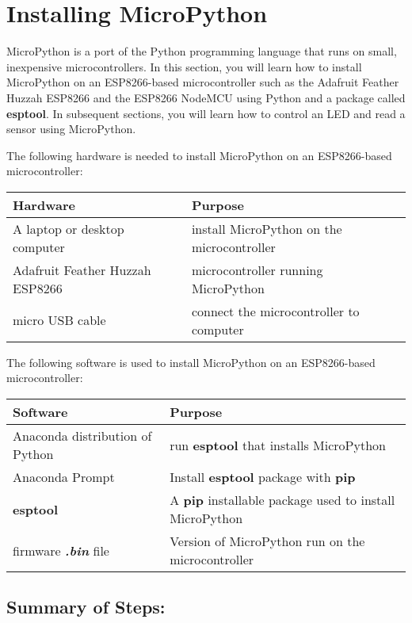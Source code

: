 \documentclass{book}
\begin{document}
    
        \hypertarget{installing-micropython}{%
\section{Installing MicroPython}\label{installing-micropython}}
    




    
        MicroPython is a port of the Python programming language that runs on
small, inexpensive microcontrollers. In this section, you will learn how
to install MicroPython on an ESP8266-based microcontroller such as the
Adafruit Feather Huzzah ESP8266 and the ESP8266 NodeMCU using Python and
a package called \textbf{esptool}. In subsequent sections, you will
learn how to control an LED and read a sensor using MicroPython.
    




    
        The following hardware is needed to install MicroPython on an
ESP8266-based microcontroller:

\begin{longtable}[]{@{}ll@{}}
\toprule
Hardware & Purpose\tabularnewline
\midrule
\endhead
A laptop or desktop computer & install MicroPython on the
microcontroller\tabularnewline
Adafruit Feather Huzzah ESP8266 & microcontroller running
MicroPython\tabularnewline
micro USB cable & connect the microcontroller to computer\tabularnewline
\bottomrule
\end{longtable}

The following software is used to install MicroPython on an
ESP8266-based microcontroller:

\begin{longtable}[]{@{}ll@{}}
\toprule
Software & Purpose\tabularnewline
\midrule
\endhead
Anaconda distribution of Python & run \textbf{esptool} that installs
MicroPython\tabularnewline
Anaconda Prompt & Install \textbf{esptool} package with
\textbf{pip}\tabularnewline
\textbf{esptool} & A \textbf{pip} installable package used to install
MicroPython\tabularnewline
firmware \textbf{\emph{.bin}} file & Version of MicroPython run on the
microcontroller\tabularnewline
\bottomrule
\end{longtable}
    




    
        \hypertarget{summary-of-steps}{%
\subsection{Summary of Steps:}\label{summary-of-steps}}
    
\end{document}
